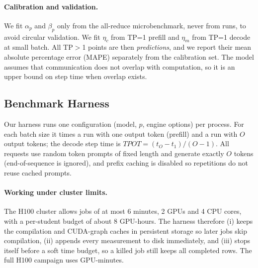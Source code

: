\paragraph{Calibration and validation.}
We fit $\alpha_p$ and $\beta_p$ only from the all-reduce microbenchmark, never from \vllm
runs, to avoid circular validation.
We fit $\eta_c$ from TP=1 prefill and $\eta_m$ from TP=1 decode at small batch.
All TP$>$1 points are then \emph{predictions}, and we report their mean absolute
percentage error (MAPE) separately from the calibration set.
The model assumes that communication does not overlap with computation, so it is an upper
bound on step time when overlap exists.

\subsection{Benchmark Harness}
Our harness runs one configuration (model, $p$, engine options) per process.
For each batch size it times a run with one output token (prefill) and a run with $O$
output tokens; the decode step time is
$\mathit{TPOT} = (t_{O} - t_{1})/(O-1)$.
All requests use random token prompts of fixed length and generate exactly $O$ tokens
(end-of-sequence is ignored), and prefix caching is disabled so repetitions do not reuse
cached prompts.

\paragraph{Working under cluster limits.}
The H100 cluster allows jobs of at most 6 minutes, 2 GPUs and 4 CPU cores, with a
per-student budget of about 8 GPU-hours.
The harness therefore (i) keeps the compilation and CUDA-graph caches in persistent
storage so later jobs skip compilation, (ii) appends every measurement to disk
immediately, and (iii) stops itself before a soft time budget, so a killed job still
keeps all completed rows.
The full H100 campaign uses \tbd GPU-minutes.
